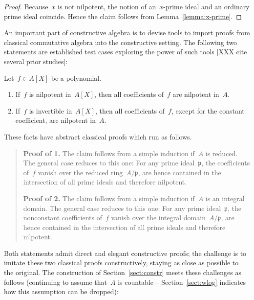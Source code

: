 \documentclass[envcountsect,envcountsame,runningheads]{llncs}
\newcommand{\ppp}{\mathfrak{p}}
\renewcommand{\_}{\mathpunct{.}\,}
\begin{document}
\begin{proof}Because~$x$ is not nilpotent, the notion of an~$x$-prime ideal and
an ordinary prime ideal coincide. Hence the claim follows from
Lemma~\ref{lemma:x-prime}.\end{proof}

An important part of constructive algebra is to devise tools to import
proofs from classical commutative algebra into the constructive setting.
The following two statements are established test cases exploring the power of
such tools [XXX cite several prior studies]:

\begin{proposition}\label{prop:test-cases}Let~$f \in A[X]$ be a polynomial.
\begin{enumerate}
\item If~$f$ is nilpotent in~$A[X]$, then all coefficients of~$f$ are nilpotent in~$A$.
\item If~$f$ is invertible in~$A[X]$, then all coefficients of~$f$, except for
the constant coefficient, are
nilpotent in~$A$.
\end{enumerate}
\end{proposition}

These facts have abstract classical proofs which run as follows.

\begin{quote}\small
  \textbf{Proof of 1.} The claim follows from a simple induction if~$A$ is
  reduced. The general case reduces to this one: For any prime ideal~$\ppp$,
  the coefficients of~$f$ vanish over the reduced ring~$A/\ppp$, are hence
  contained in the intersection of all prime ideals and therefore
  nilpotent.\medskip

  \textbf{Proof of 2.} The claim follows from a simple induction if~$A$ is an
  integral domain. The general case reduces to this one: For any prime
  ideal~$\ppp$, the nonconstant coefficients of~$f$ vanish over the integral
  domain~$A/\ppp$, are hence contained in the intersection of all prime ideals
  and therefore nilpotent.
\end{quote}

Both statements admit direct and elegant constructive proofs; the challenge is
to imitate these two classical proofs constructively, staying as close as
possible to the original. The construction of Section~\ref{sect:constr} meets
these challenges as follows (continuing to assume that~$A$ is countable --
Section~\ref{sect:wlog} indicates how this assumption can be dropped):
\end{document}
